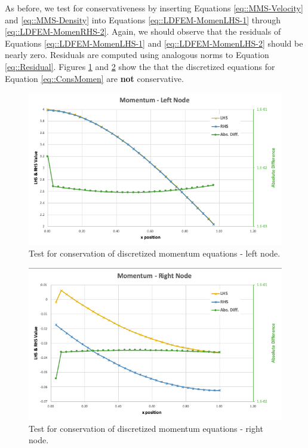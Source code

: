 \documentclass{article}
\begin{document}
As before, we test for conservativeness by inserting Equations \ref{eq::MMS-Velocity} and \ref{eq::MMS-Density} into Equations \ref{eq::LDFEM-MomenLHS-1} through \ref{eq::LDFEM-MomenRHS-2}. Again, we should observe that the residuals of Equations \ref{eq::LDFEM-MomenLHS-1} and \ref{eq::LDFEM-MomenLHS-2} should be nearly zero. Residuals are computed using analogous norms to Equation \ref{eq::Residual}. Figures \ref{fig::Momen-1} and \ref{fig::Momen-2} show the that the discretized equations for Equation \ref{eq::ConsMomen} are \textbf{not} conservative.
\begin{figure}[h!]
\centering
\includegraphics[scale=0.4]{./figures/Momen_1}
\caption{Test for conservation of discretized momentum equations - left node.}
\label{fig::Momen-1}
\end{figure}
\begin{figure}[h!]
\centering
\includegraphics[scale=0.4]{./figures/Momen_2}
\caption{Test for conservation of discretized momentum equations - right node.}
\label{fig::Momen-2}
\end{figure}
\end{document}
